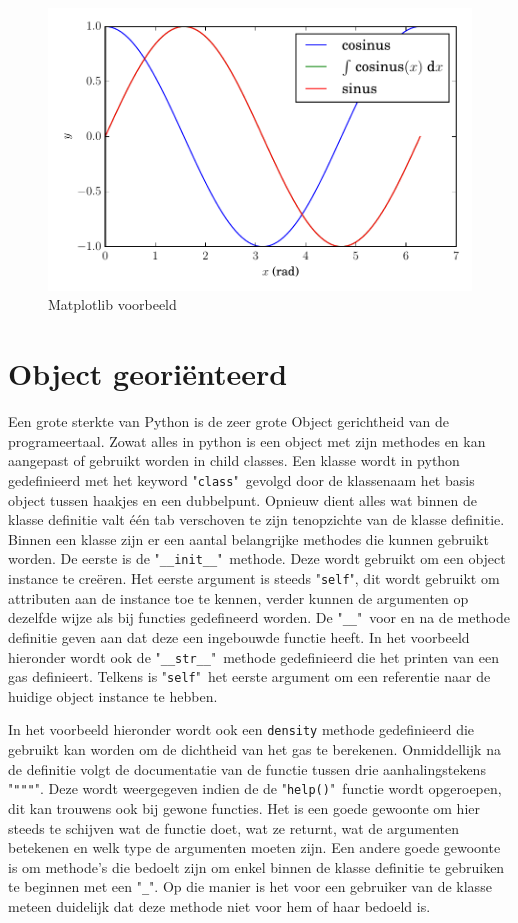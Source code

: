 \documentclass[11pt,twoside]{article}
\begin{document}
\begin{figure}[ht]
	\centering
	\includegraphics[scale=0.5]{examples/sinus_cosinus}
	\caption{Matplotlib voorbeeld}
	\label{fig:sinus_cosinus}
\end{figure}

	\section{Object georiënteerd} 
Een grote sterkte van Python is de zeer grote Object gerichtheid van de programeertaal. Zowat alles in python is een object met zijn methodes en kan aangepast of gebruikt worden in child classes. Een klasse wordt in python gedefinieerd met het keyword "\lstinline{class}"\ gevolgd door de klassenaam het basis object tussen haakjes en een dubbelpunt. Opnieuw dient alles wat binnen de klasse definitie valt één tab verschoven te zijn tenopzichte van de klasse definitie. Binnen een klasse zijn er een aantal belangrijke methodes die kunnen gebruikt worden. De eerste is de "\lstinline{__init__}"\ methode. Deze wordt gebruikt om een object instance te creëren. Het eerste argument is steeds "\lstinline{self}", dit wordt gebruikt om attributen aan de instance toe te kennen, verder kunnen de argumenten op dezelfde wijze als bij functies gedefineerd worden. De "\lstinline{__}"\ voor en na de methode definitie geven aan dat deze een ingebouwde functie heeft. In het voorbeeld hieronder wordt ook de "\lstinline{__str__}"\ methode gedefinieerd die het printen van een gas definieert. Telkens is "\lstinline{self}"\ het eerste argument om een referentie naar de huidige object instance te hebben.

In het voorbeeld hieronder wordt ook een \lstinline{density} methode gedefinieerd die gebruikt kan worden om de dichtheid van het gas te berekenen. Onmiddellijk na de definitie volgt de documentatie van de functie tussen drie aanhalingstekens "\lstinline{"""}". Deze wordt weergegeven indien de de "\lstinline{help()}"\ functie wordt opgeroepen, dit kan trouwens ook bij gewone functies. Het is een goede gewoonte om hier steeds te schijven wat de functie doet, wat ze returnt, wat de argumenten betekenen en welk type de argumenten moeten zijn. Een andere goede gewoonte is om methode's die bedoelt zijn om enkel binnen de klasse definitie te gebruiken te beginnen met een "\lstinline{_}". Op die manier is het voor een gebruiker van de klasse meteen duidelijk dat deze methode niet voor hem of haar bedoeld is. 
\end{document}
